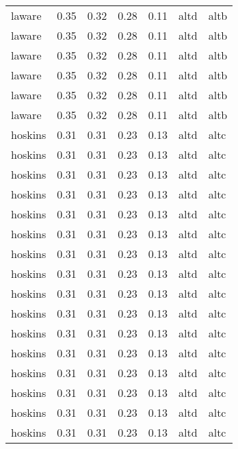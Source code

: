 \begin{tabular}{lrrrrll}
    laware &     0.35 &     0.32 &     0.28 &     0.11 &      altd &     altb \\
    laware &     0.35 &     0.32 &     0.28 &     0.11 &      altd &     altb \\
    laware &     0.35 &     0.32 &     0.28 &     0.11 &      altd &     altb \\
    laware &     0.35 &     0.32 &     0.28 &     0.11 &      altd &     altb \\
    laware &     0.35 &     0.32 &     0.28 &     0.11 &      altd &     altb \\
    laware &     0.35 &     0.32 &     0.28 &     0.11 &      altd &     altb \\
   hoskins &     0.31 &     0.31 &     0.23 &     0.13 &      altd &     altc \\
   hoskins &     0.31 &     0.31 &     0.23 &     0.13 &      altd &     altc \\
   hoskins &     0.31 &     0.31 &     0.23 &     0.13 &      altd &     altc \\
   hoskins &     0.31 &     0.31 &     0.23 &     0.13 &      altd &     altc \\
   hoskins &     0.31 &     0.31 &     0.23 &     0.13 &      altd &     altc \\
   hoskins &     0.31 &     0.31 &     0.23 &     0.13 &      altd &     altc \\
   hoskins &     0.31 &     0.31 &     0.23 &     0.13 &      altd &     altc \\
   hoskins &     0.31 &     0.31 &     0.23 &     0.13 &      altd &     altc \\
   hoskins &     0.31 &     0.31 &     0.23 &     0.13 &      altd &     altc \\
   hoskins &     0.31 &     0.31 &     0.23 &     0.13 &      altd &     altc \\
   hoskins &     0.31 &     0.31 &     0.23 &     0.13 &      altd &     altc \\
   hoskins &     0.31 &     0.31 &     0.23 &     0.13 &      altd &     altc \\
   hoskins &     0.31 &     0.31 &     0.23 &     0.13 &      altd &     altc \\
   hoskins &     0.31 &     0.31 &     0.23 &     0.13 &      altd &     altc \\
   hoskins &     0.31 &     0.31 &     0.23 &     0.13 &      altd &     altc \\
   hoskins &     0.31 &     0.31 &     0.23 &     0.13 &      altd &     altc \\

\end{tabular}
